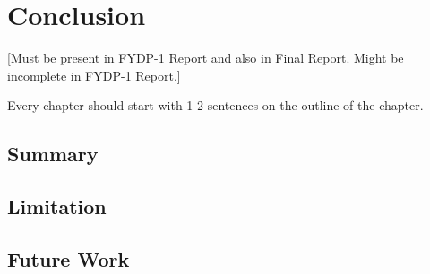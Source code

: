 \chapter{Conclusion}

[Must be present in FYDP-1 Report and also in Final Report. Might be incomplete in FYDP-1 Report.]

Every chapter should start with 1-2 sentences on the outline of the chapter.

\section{Summary}
\section{Limitation}
\section{Future Work}
